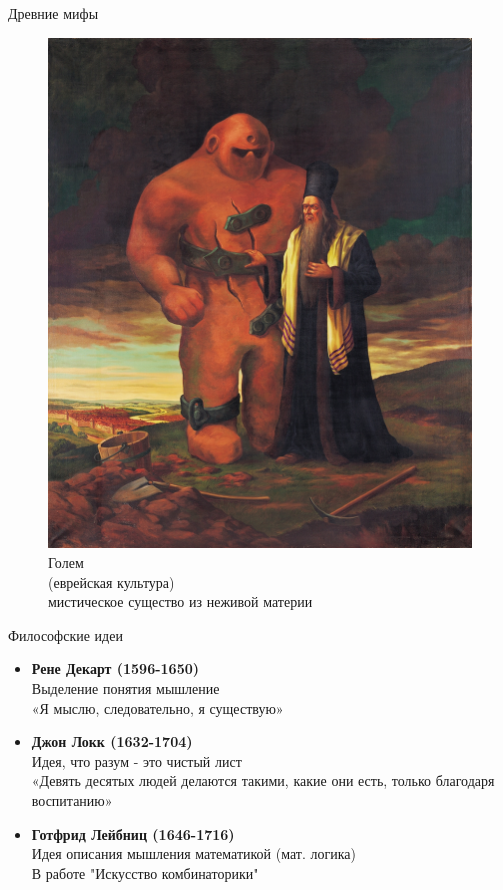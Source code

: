 \documentclass{beamer}
\begin{document}
\begin{frame}{Древние мифы}
\begin{figure}[h]
\begin{center}
\begin{minipage}[h]{0.35\linewidth}
    \includegraphics[width=1\linewidth]{img/golem.jpg}
    \caption{Голем \\(еврейская культура) \\мистическое существо из неживой материи}
    \label{ris:experimcoded}
    \end{minipage}
    \end{center}
    \end{figure}
\end{frame}

\begin{frame}{Философские идеи}

\begin{itemize}
    \item \textbf{Рене Декарт (1596-1650)}\\
        Выделение понятия мышление\\
        «Я мыслю, следовательно, я существую»
            
    \item \textbf{Джон Локк (1632-1704)}\\
        Идея, что разум - это чистый лист \\
        «Девять десятых людей делаются такими, какие они есть, только благодаря воспитанию»
        
    \item \textbf{Готфрид Лейбниц (1646-1716)}\\
        Идея описания мышления математикой (мат. логика)\\
        В работе "Искусство комбинаторики"
\end{itemize}
\end{frame}
\end{document}
